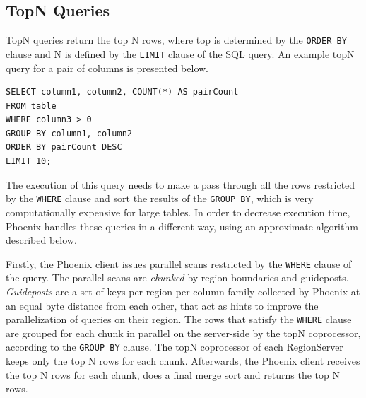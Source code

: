 \subsection{TopN Queries}

TopN queries return the top N rows, where top is determined by the \texttt{ORDER BY} clause and N is defined by the \texttt{LIMIT} clause of the SQL query. An example topN query for a pair of columns is presented below.

\begin{lstlisting}[language=PhoenixSQL]
SELECT column1, column2, COUNT(*) AS pairCount
FROM table
WHERE column3 > 0
GROUP BY column1, column2
ORDER BY pairCount DESC
LIMIT 10;
\end{lstlisting}

The execution of this query needs to make a pass through all the rows restricted by the \texttt{WHERE} clause and sort the results of the \texttt{GROUP BY}, which is very computationally expensive  for large tables. In order to decrease execution time, Phoenix handles these queries in a different way, using an approximate algorithm described below.

Firstly, the Phoenix client issues parallel scans restricted by the \texttt{WHERE} clause of the query. The parallel scans are \emph{chunked} by region boundaries and guideposts. \emph{Guideposts} are a set of keys per region per column family collected by Phoenix at an equal byte distance from each other, that act as hints to improve the parallelization of queries on their region. The rows that satisfy the \texttt{WHERE} clause are grouped for each chunk in parallel on the server-side by the topN coprocessor, according to the \texttt{GROUP BY} clause. The topN coprocessor of each RegionServer keeps only the top N rows for each chunk. Afterwards, the Phoenix client receives the top N rows for each chunk, does a final merge sort and returns the top N rows.


\cleardoublepage
